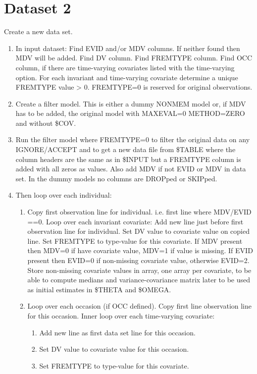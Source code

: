 \section{Dataset 2}
Create a new data set.
\begin{enumerate} 
	\item In input dataset: Find EVID and/or MDV columns. If neither found then MDV will be added. Find DV column. Find FREMTYPE column. Find OCC column, if there are time-varying covariates listed with the time-varying option. For each invariant and time-varying covariate  determine a unique FREMTYPE value > 0. FREMTYPE=0 is reserved for original observations.
    \item Create a filter model. This is either a dummy NONMEM model or, if MDV has to be added, the original model with MAXEVAL=0 METHOD=ZERO and without \$COV. 
	\item Run the filter model where FREMTYPE=0 to filter the original data on any IGNORE/ACCEPT and to get a new data file from \$TABLE where the column headers are the same as in \$INPUT but a FREMTYPE column is added with all zeros as values. Also add MDV if not EVID or MDV in data set. In the dummy models no columns are DROPped or SKIPped.
\item Then loop over each individual: 
\begin{enumerate}
	\item Copy first observation line for individual. i.e. first line where MDV/EVID ==0. 
Loop over each invariant covariate: Add new line just before first observation line for individual. 
Set DV value to covariate value on copied line. 
Set FREMTYPE to type-value for this covariate. 
If MDV present then MDV=0 if have covariate value, MDV=1 if value is missing. 
If EVID present then EVID=0 if non-missing covariate value, otherwise EVID=2. 
Store non-missing covariate values in array, one array per covariate, to be able to compute medians and 
variance-covariance matrix later to be used as initial estimates in \$THETA and \$OMEGA. 
	\item Loop over each occasion (if OCC defined). 
Copy first line observation line for this occasion. 
Inner loop over each time-varying covariate: 
\begin{enumerate}
	\item Add new line as first data set line for this occasion. 
    \item Set DV value to covariate value for this occasion. 
    \item Set FREMTYPE to type-value for this covariate. 

\end{enumerate}
\end{enumerate}
\end{enumerate}
